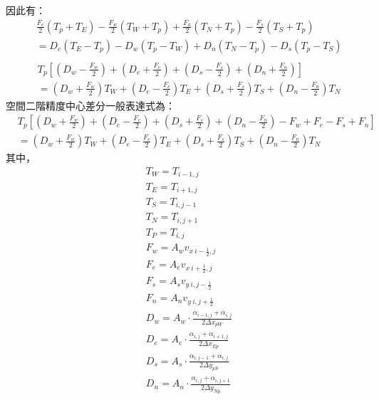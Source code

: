 \documentclass[12pt]{article}
\begin{document}
\noindent 因此有：
\begin{equation}
\begin{split}
  &\frac{F_{e}}{2}(T_{p} + T_{E})-\frac{F_{w}}{2}(T_{W} + T_{p})+\frac{F_{n}}{2}(T_{N} + T_{p})-\frac{F_{s}}{2}(T_{S} + T_{p})\\
  & = D_{e} (T_{E}-T_{p} )- D_{w} (T_{p}-T_{W}) + D_{n} (T_{N}-T_{p}) - D_{s} (T_{p}-T_{S})\\
\end{split}
\end{equation}
\begin{equation}
\begin{split}
  &T_{p}\left[(D_{w}-\frac{F_{w}}{2})+(D_{e}+\frac{F_{e}}{2})+(D_{s}-\frac{F_{s}}{2})+(D_{n}+\frac{F_{n}}{2})\right] \\
  &= (D_{w}+\frac{F_{w}}{2})T_{W}+(D_{e}-\frac{F_{e}}{2})T_{E}+(D_{s}+\frac{F_{s}}{2})T_{S}+(D_{n}-\frac{F_{n}}{2})T_{N}
\end{split}
\end{equation}
\noindent 空間二階精度中心差分一般表達式為： 
\begin{equation}
\begin{split}
  &T_{p}\left[(D_{w}+\frac{F_{w}}{2})+(D_{e}-\frac{F_{e}}{2})+(D_{s}+\frac{F_{s}}{2})+(D_{n}-\frac{F_{n}}{2}) - F_{w} + F_{e} - F_{s} + F_{n} \right] \\
  &= (D_{w}+\frac{F_{w}}{2})T_{W}+(D_{e}-\frac{F_{e}}{2})T_{E}+(D_{s}+\frac{F_{s}}{2})T_{S}+(D_{n}-\frac{F_{n}}{2})T_{N}
\end{split}
\end{equation}
\noindent 其中，
\begin{equation}
\begin{split}
  &T_{W} = T_{i-1,j}\\
  &T_{E} = T_{i+1,j}\\
  &T_{S} = T_{i,j-1}\\
  &T_{N} = T_{i,j+1}\\
  &T_{P} = T_{i,j}\\
  &F_{w} = A_{w} v_{x\ i-\frac{1}{2},j}\\
  &F_{e} = A_{e} v_{x\ i+\frac{1}{2},j}\\
  &F_{s} = A_{s} v_{y\ i,j-\frac{1}{2}}\\
  &F_{n} = A_{n} v_{y\ i,j+\frac{1}{2}}\\
  &D_{w} = A_{w} \cdot \frac{\alpha_{i-1,j} + \alpha_{i,j}}{2\Delta x_{pW}}\\
  &D_{e} = A_{e} \cdot \frac{\alpha_{i,j} + \alpha_{i+1,j}}{2\Delta x_{Ep}}\\
  &D_{s} = A_{s} \cdot \frac{\alpha_{i,j-1} + \alpha_{i,j}}{2\Delta y_{pS}}\\
  &D_{n} = A_{n} \cdot \frac{\alpha_{i,j} + \alpha_{i,j+1}}{2\Delta y_{Np}}\\
\end{split}
\end{equation}
\end{document}
